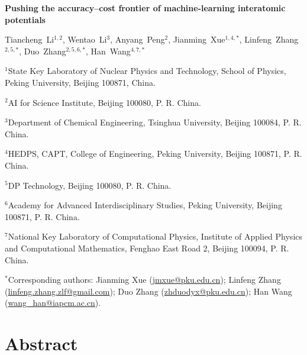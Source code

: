 \begingroup
\singlespacing
\begin{center}
    {\Large\bfseries Pushing the accuracy--cost frontier of machine-learning interatomic potentials\par}
    \vspace{1em}
    Tiancheng~Li$^{1,2}$, Wentao~Li$^{3}$, Anyang~Peng$^{2}$, Jianming~Xue$^{1,4,*}$, Linfeng~Zhang$^{2,5,*}$, Duo~Zhang$^{2,5,6,*}$, Han~Wang$^{4,7,*}$\par
\end{center}

\begingroup
\small
\setlength{\parskip}{3pt}
\noindent $^{1}$State Key Laboratory of Nuclear Physics and Technology, School of Physics, Peking University, Beijing 100871, China.\par
\noindent $^{2}$AI for Science Institute, Beijing 100080, P. R. China.\par
\noindent $^{3}$Department of Chemical Engineering, Tsinghua University, Beijing 100084, P. R. China.\par
\noindent $^{4}$HEDPS, CAPT, College of Engineering, Peking University, Beijing 100871, P. R. China.\par
\noindent $^{5}$DP Technology, Beijing 100080, P. R. China.\par
\noindent $^{6}$Academy for Advanced Interdisciplinary Studies, Peking University, Beijing 100871, P. R. China.\par
\noindent $^{7}$National Key Laboratory of Computational Physics, Institute of Applied Physics and Computational Mathematics, Fenghao East Road 2, Beijing 100094, P. R. China.\par
\noindent $^{*}$Corresponding authors: Jianming Xue (\href{mailto:jmxue@pku.edu.cn}{jmxue@pku.edu.cn}); Linfeng Zhang (\href{mailto:linfeng.zhang.zlf@gmail.com}{linfeng.zhang.zlf@gmail.com}); Duo Zhang (\href{mailto:zhduodyx@pku.edu.cn}{zhduodyx@pku.edu.cn}); Han Wang (\href{mailto:wang_han@iapcm.ac.cn}{wang\_han@iapcm.ac.cn}).\par
\endgroup

\section*{Abstract}

\par
\endgroup
